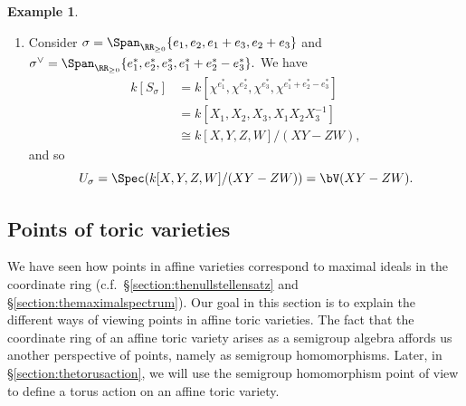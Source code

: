 \documentclass[12pt]{amsart}
\theoremstyle{plain}
\theoremstyle{definition}
\newtheorem{example}[theorem]{Example}
\begin{document}
\begin{example}
\begin{enumerate}
\begin{figure}[H]
\end{figure}
\noindent
While $\{2 e_1^* + e_2^*, e_2^*\}$ generates $\sigma^\vee$ as a cone, it does not generate $S_\sigma$ as a semigroup, since not every element in $S_\sigma$ lies in $\Span_{\ZZ_{\ge 0}} \{2 e_1^* + e_2^*,  e_2^*\}$.
For example, $e_1^* + e_2^* \in S_\sigma$, but $e_1^* + e_2^* \notin \Span_{\ZZ_{\ge 0}} \{2 e_1^* + e_2^*,  e_2^*\}.$
However, $\{e_2^*, 2 e_1^* + e_2^*,  e_1^* + e_2^*\}$ generates $S_\sigma$.
Then,
\begin{align*}
	\qquad k[S_\sigma] = k[\chi^{e_2^*}, \chi^{2 e_1^* + e_2^*}, \chi^{e_1^* + e_2^*}] &= k[X_2, X_1^2 X_2, X_1 X_2] \cong k[X, Y, Z] / (X Y - Z^2),
\end{align*}
and
$$U_\sigma = \Spec(k[X, Y, Z] / (XY - Z^2) )= \bV(X Y - Z^2).$$

\item
Consider $\sigma = \Span_{\RR_{\ge 0}}\{ e_1, e_2, e_1+e_3, e_2 + e_3\}$ and $\sigma^\vee = \Span_{\RR_{\ge 0}} \{e_1^*, e_2^*, e_3^*, e_1^* +e_2^* - e_3^*\}.$
We have 
\begin{align*}
	k[S_\sigma] &= k[\chi^{e_1^*}, \chi^{e_2^*}, \chi^{e_3^*}, \chi^{e_1^* +e_2^* - e_3^*}] \\
	&= k[X_1, X_2, X_3, X_1 X_2 X_3^{-1}] \\
	&\cong k[X, Y, Z, W]/(XY - ZW),
\end{align*}
and so
$$U_\sigma = \Spec(k[X, Y, Z, W] / (XY - ZW) ) = \bV(XY-ZW).$$
\end{enumerate}
\end{example}





\subsection{Points of toric varieties}\label{section:points}
We have seen how points in affine varieties correspond to maximal ideals in the coordinate ring (c.f.\ \S \ref{section:thenullstellensatz} and \S \ref{section:themaximalspectrum}).
Our goal in this section is to explain the different ways of viewing points in affine toric varieties.
The fact that the coordinate ring of an affine toric variety arises as a semigroup algebra affords us another perspective of points, namely as semigroup homomorphisms.
Later, in \S\ref{section:thetorusaction}, we will use the semigroup homomorphism point of view to define a torus action on an affine toric variety.
\end{document}
